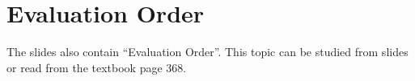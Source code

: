 \section{Evaluation Order}

The slides also contain ``Evaluation Order''. This topic can be studied from slides or read from the textbook page 368.